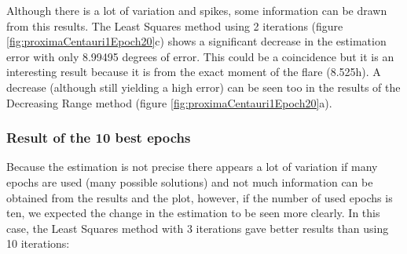 Although there is a lot of variation and spikes, some information can be drawn from this results. The Least Squares method using 2 iterations (figure \ref{fig:proximaCentauri1Epoch20}c) shows a significant decrease in the estimation error with only 8.99495 degrees of error. This could be a coincidence but it is an interesting result because it is from the exact moment of the flare (8.525h). A decrease (although still yielding a high error) can be seen too in the results of the Decreasing Range method (figure \ref{fig:proximaCentauri1Epoch20}a).

\clearpage

\subsubsection{Result of the 10 best epochs}

Because the estimation is not precise there appears a lot of variation if many epochs are used (many possible solutions) and not much information can be obtained from the results and the plot, however, if the number of used epochs is ten, we expected the change in the estimation to be seen more clearly. In this case, the Least Squares method with 3 iterations gave better results than using 10 iterations:

